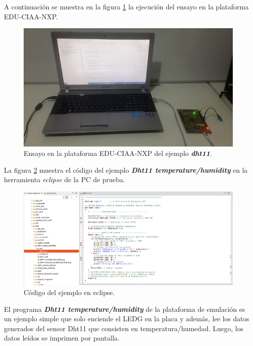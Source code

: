 A continuación se muestra en la figura \ref{fig:TestHardware} la ejecución del ensayo en la plataforma EDU-CIAA-NXP.

\begin{figure}[ht]
	\centering
	\includegraphics[scale=.49]{./Figures/TestHardware.jpeg}
	\caption{Ensayo en la plataforma EDU-CIAA-NXP del ejemplo \textit{\textbf{dht11}}.}
	\label{fig:TestHardware}
\end{figure}



La figura \ref{fig:TestEclipse} muestra el código del ejemplo \textit{\textbf{Dht11 temperature/humidity}} en la herramienta \textit{eclipse} de la PC de prueba.

\begin{figure}[ht]
	\centering
	\includegraphics[scale=.22]{./Figures/TestEclipse.png}
	\caption{Código del ejemplo en eclipse.}
	\label{fig:TestEclipse}
\end{figure}


El programa \textit{\textbf{Dht11 temperature/humidity}} de la plataforma de emulación es un ejemplo simple que solo enciende el LEDG en la placa y además, lee los datos generados del sensor Dht11 que consisten en temperatura/humedad. Luego, los datos leídos se imprimen por pantalla. 

